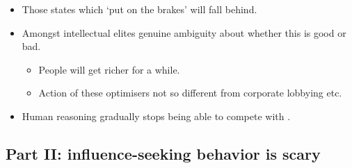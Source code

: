 \begin{itemize}
\begin{itemize}
    \end{itemize}
    \item Those states which `put on the brakes' will fall behind.
    \item Amongst intellectual elites genuine ambiguity about whether this is good or bad.
    \begin{itemize}
        \item People will get richer for a while.
        \item Action of these optimisers not so different from corporate lobbying etc.
    \end{itemize}
    \item Human reasoning gradually stops being able to compete with . 
\end{itemize}


\subsection{Part II: influence-seeking behavior is scary}

